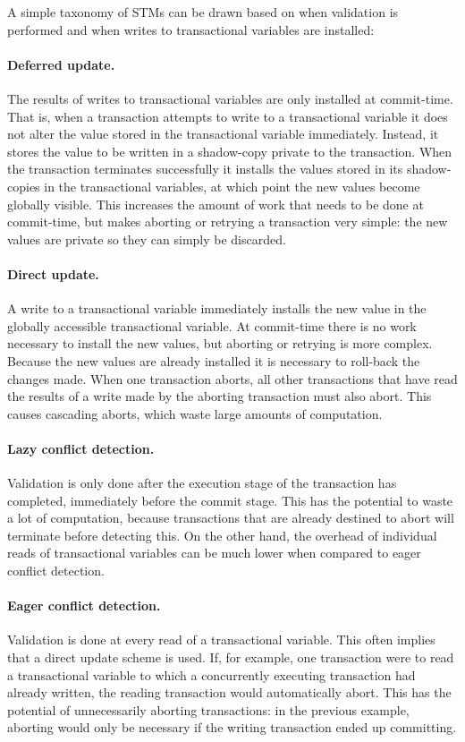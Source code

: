 \documentclass[12pt,a4paper,oneside,openright]{report}
\begin{document}
A simple taxonomy of STMs can be drawn based on when validation is
performed and when writes to transactional variables are installed:

\paragraph{Deferred update.} The results of writes to transactional
variables are only installed at commit-time. That is, when a
transaction attempts to write to a transactional variable it does not
alter the value stored in the transactional variable
immediately. Instead, it stores the value to be written in a
shadow-copy private to the transaction. When the transaction
terminates successfully it installs the values stored in its
shadow-copies in the transactional variables, at which point the new
values become globally visible. This increases the amount of work that
needs to be done at commit-time, but makes aborting or retrying a
transaction very simple: the new values are private so they can simply
be discarded.

\paragraph{Direct update.} A write to a transactional variable
immediately installs the new value in the globally accessible
transactional variable. At commit-time there is no work necessary to
install the new values, but aborting or retrying is more
complex. Because the new values are already installed it is necessary
to roll-back the changes made. When one transaction aborts, all other
transactions that have read the results of a write made by the
aborting transaction must also abort. This causes cascading aborts,
which waste large amounts of computation.

\paragraph{Lazy conflict detection.} Validation is only done after the
execution stage of the transaction has completed, immediately before
the commit stage. This has the potential to waste a lot of
computation, because transactions that are already destined to abort
will terminate before detecting this. On the other hand, the overhead
of individual reads of transactional variables can be much lower when
compared to eager conflict detection.

\paragraph{Eager conflict detection.} Validation is done at every read
of a transactional variable. This often implies that a direct update
scheme is used. If, for example, one transaction were to read a
transactional variable to which a concurrently executing transaction
had already written, the reading transaction would automatically
abort. This has the potential of unnecessarily aborting transactions:
in the previous example, aborting would only be necessary if the
writing transaction ended up committing.
\end{document}
